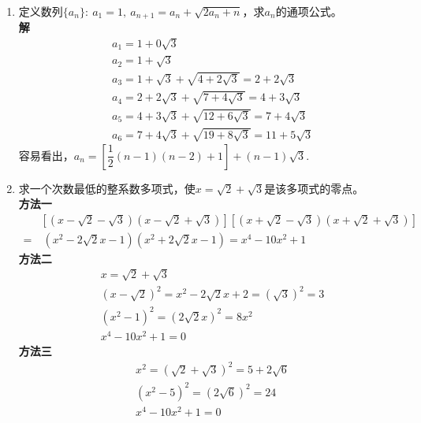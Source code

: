 \begin{enumerate}[label={【\textbf{例\thechapter.\arabic*}】},
 leftmargin=\inteval{\myenumleftmargin}pt,
 itemsep=\inteval{\myenumitempsep}pt,
 itemindent=\inteval{\myenumitemindent}pt]
满足$ m^2-5n^2=1 $的整数$ m,n $更稀少，在$ |m|<1000 $的范围内，
只有如下两组：
\begin{gather*}
    9^2-5\cdot 4^2=1,\quad  161^2-5\cdot 72^2=1
\end{gather*}
\textbf{注2}：敏锐的读者应该能察觉到，上面的$ \sqrt{3},\sqrt{5} $(只要$ \sqrt{C} $
不是有理数)与虚数单位$ \i $存在一些相似之处，消去$ \dfrac{1}{A+B\sqrt{C}} $
分母中的根号，与消去$ \dfrac{1}{A+B\i} $分母中的$ \i $，方法是一样的。对于复数
$ z_1,z_2 $，有$ |z_1z_2|=|z_1||z_2| $，但对于本例中的$ x $，不论是定义
$ |x|=\sqrt{a^2+b^2} $还是定义$ |x|=\sqrt{a^2+3b^2} $，
$ |xy| $与$ |x||y| $都不相等。

\item 定义数列$ \{a_n\}:\ a_1=1,\ a_{n+1}=a_n+\sqrt{2a_n+n} $，求$ a_n $的通项公式。\\
\textbf{解}\ 
\begin{align*}
    & a_1=1+0\sqrt{3} \\
    & a_2=1+\sqrt{3} \\
    & a_3=1+\sqrt{3}+\sqrt{4+2\sqrt{3}}=2+2\sqrt{3} \\
    & a_4=2+2\sqrt{3}+\sqrt{7+4\sqrt{3}}=4+3\sqrt{3} \\
    & a_5=4+3\sqrt{3}+\sqrt{12+6\sqrt{3}}=7+4\sqrt{3} \\
    & a_6=7+4\sqrt{3}+\sqrt{19+8\sqrt{3}}=11+5\sqrt{3} 
\end{align*}
容易看出，$ a_n=\left[\dfrac{1}{2}(n-1)(n-2)+1\right]+(n-1)\sqrt{3} $.

\item 求一个次数最低的整系数多项式，使$ x=\sqrt{2}+\sqrt{3} $是该多项式的零点。\\
\textbf{方法一}\ 
\begin{align*}
    &\left[(x-\sqrt{2}-\sqrt{3})(x-\sqrt{2}+\sqrt{3})\right]
    \left[(x+\sqrt{2}-\sqrt{3})(x+\sqrt{2}+\sqrt{3})\right] \\
    =&\ (x^2-2\sqrt{2}x-1)(x^2+2\sqrt{2}x-1)=x^4 - 10x^2 + 1 
\end{align*}
\textbf{方法二}\ 
\begin{align}
    & x=\sqrt{2}+\sqrt{3} \nonumber \\
    & (x-\sqrt{2})^2=x^2-2\sqrt{2}x+2=(\sqrt{3})^2=3 \nonumber \\
    & (x^2-1)^2=(2\sqrt{2}x)^2=8x^2 \nonumber \\
    & x^4 - 10x^2 + 1= 0  \label{x4-10x2+1}
\end{align}
\textbf{方法三}\ 
\begin{align*}
    & x^2=(\sqrt{2}+\sqrt{3})^2=5+2\sqrt{6} \\
    & (x^2-5)^2=(2\sqrt{6})^2=24 \\
    & x^4 - 10x^2 + 1= 0
\end{align*}


\end{enumerate}

